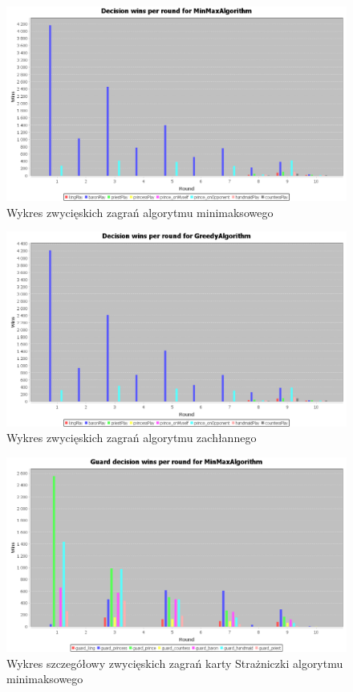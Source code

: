\begin{figure}[H]
	\centering
	\includegraphics[width=\textwidth]{Resources/MirrorMmVsG/MmVsGDecision.PNG}
	\caption{Wykres zwycięskich zagrań algorytmu minimaksowego} 
	\label{fig:MirrorMmVsGDecision}
\end{figure} 

\begin{figure}[H]
	\centering
	\includegraphics[width=\textwidth]{Resources/MirrorMmVsG/GVsMmDecision.PNG}
	\caption{Wykres zwycięskich zagrań algorytmu zachłannego} 
	\label{fig:MirrorGVsMmDecision}
\end{figure} 

\begin{figure}[H]
	\centering
	\includegraphics[width=\textwidth]{Resources/MirrorMmVsG/MmVsGGuardDecision.PNG}
	\caption{Wykres szczegółowy zwycięskich zagrań karty Strażniczki algorytmu minimaksowego} 
	\label{fig:MmVsGGuardDecisionn}
\end{figure}

